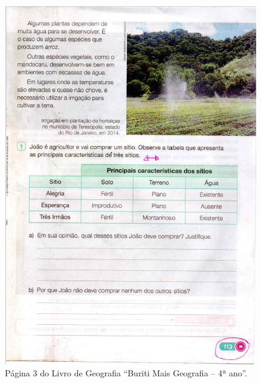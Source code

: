 \documentclass[portuguese]{textolivre}
\begin{document}
\begin{figure}[htbp]
 \centering
 \begin{minipage}{.45\textwidth}
 \includegraphics[width=\textwidth]{Fig3.png}
 \caption{Página 3 do Livro de Geografia “Buriti Mais Geografia – 4ª ano”.}
 \label{fig3}
 \end{minipage}%
 \hfill
 \begin{minipage}{0.45\textwidth}

\end{minipage}
\end{figure}
\end{document}
